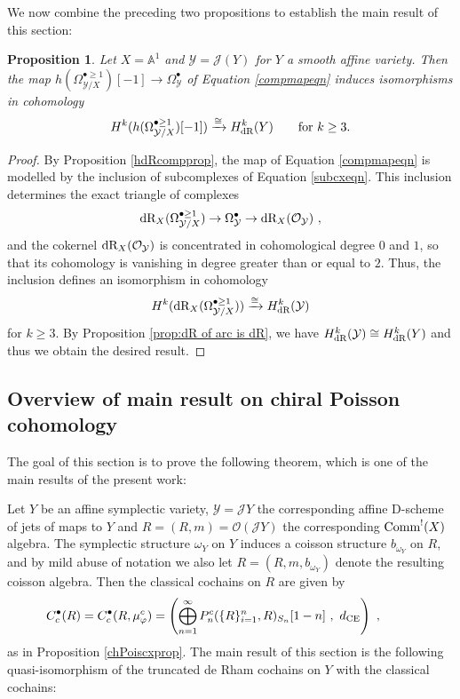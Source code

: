 \documentclass[11pt]{amsart}
\numberwithin{equation}{section}
\newtheorem{prop}[theo]{Proposition}
\theoremstyle{definition}
\newcommand{\bb}{\mathbb}
\newcommand{\mc}{\mathcal}
\newcommand{\dR}{{\textup{dR}}}
\newcommand{\Comm}{{\textup{Comm}}}
\newcommand{\0}{{\textbf{0}}}
\begin{document}
We now combine the preceding two propositions to establish the main result of this section:

\begin{prop}\label{jetsdRprop} Let $X=\bb A^1$ and $\mc Y=\mc J(Y)$ for $Y$ a smooth affine variety. Then the map $	 h(\Omega^{\bullet \geq 1}_{\mc Y/X})[-1] \to \Omega^\bullet_{\mc Y} $ of Equation \ref{compmapeqn} induces isomorphisms in cohomology
\[ H^k(h(\Omega^{\bullet \geq 1}_{\mc Y/X})[-1] )\xrightarrow{\cong} H^k_\dR(Y)   \qquad \text{for $k \geq 3$.} \]
\end{prop}

\begin{proof}
	
By Proposition \ref{hdRcompprop}, the map of Equation \ref{compmapeqn} is modelled by the inclusion of subcomplexes of Equation \ref{subcxeqn}. This inclusion determines the exact triangle of complexes
\[\dR_X(\Omega^{\bullet \geq 1}_{\mc Y/X}) \to \Omega^\bullet_{\mc Y} \to \dR_X(\mc O_{\mc Y}) \ , \]
and the cokernel $\dR_X(\mc O_{\mc Y})$ is concentrated in cohomological degree $0$ and $1$, so that its cohomology is vanishing in degree greater than or equal to $2$. Thus, the inclusion defines an isomorphism in cohomology
\[ H^k(\dR_X(\Omega^{\bullet \geq 1}_{\mc Y/X})) \xrightarrow{\cong} H^k_\dR(\mc Y) \]
for $k\geq 3$. By Proposition \ref{prop:dR of arc is dR}, we have $H^k_\dR(\mc Y) \cong H^k_\dR(Y)$ and thus we obtain the desired result.
\end{proof}








\iffalse



\subsection{Overview of main result on chiral Poisson cohomology}
The goal of this section is to prove the following theorem, which is one of the main results of the present work:

Let $Y$ be an affine symplectic variety, $\mc Y=\mc JY$ the corresponding affine D-scheme of jets of maps to $Y$ and $R=(R,m)=\mc O(\mc JY)$ the corresponding $\Comm^!(X)$ algebra. The symplectic structure $\omega_Y$ on $Y$ induces a coisson structure $b_{\omega_Y}$ on $R$, and by mild abuse of notation we also let $R=(R,m,b_{\omega_Y})$ denote the resulting coisson algebra. Then the classical cochains on $R$ are given by
\[ \hspace*{-1cm}C^\bullet_c(R)= C^\bullet_{c}(R,\mu_\varphi^c) = \left( \bigoplus_{n=1}^\infty   P_n^c(\{ R\}_{i=1}^n,R)_{S_n}[1-n] \ , \ d_\text{CE} \right)  \ ,\]
as in Proposition \ref{chPoiscxprop}. The main result of this section is the following quasi-isomorphism of the truncated de Rham cochains on $Y$ with the classical cochains:
\end{document}
